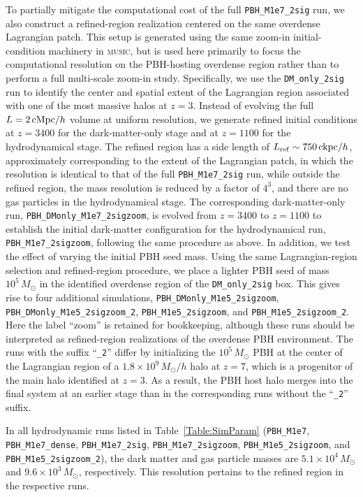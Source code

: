 \documentclass[twocolumn,trackchanges]{aastex701}
\begin{document}
To partially mitigate the computational cost of the full \texttt{PBH\_M1e7\_2sig} run, we also construct a refined-region realization centered on the same overdense Lagrangian patch. This setup is generated using the same zoom-in initial-condition machinery in \textsc{music}, but is used here primarily to focus the computational resolution on the PBH-hosting overdense region rather than to perform a full multi-scale zoom-in study. Specifically, we use the \texttt{DM\_only\_2sig} run to identify the center and spatial extent of the Lagrangian region associated with one of the most massive halos at $z=3$. Instead of evolving the full $L=2\,{\rm cMpc}/h$ volume at uniform resolution, we generate refined initial conditions at $z=3400$ for the dark-matter-only stage and at $z=1100$ for the hydrodynamical stage. The refined region has a side length of $L_{\rm ref}\sim750\,{\rm ckpc}/h$, approximately corresponding to the extent of the Lagrangian patch, in which the resolution is identical to that of the full \texttt{PBH\_M1e7\_2sig} run, while outside the refined region, the mass resolution is reduced by a factor of $4^3$, and there are no gas particles in the hydrodynamical stage. 
The corresponding dark-matter-only run, \texttt{PBH\_DMonly\_M1e7\_2sigzoom}, is evolved from $z=3400$ to $z=1100$ to establish the initial dark-matter configuration for the hydrodynamical run, \texttt{PBH\_M1e7\_2sigzoom}, following the same procedure as above. In addition, we test the effect of varying the initial PBH seed mass. Using the same Lagrangian-region selection and refined-region procedure, we place a lighter PBH seed of mass $10^5\,M_\odot$ in the identified overdense region of the \texttt{DM\_only\_2sig} box. This gives rise to four additional simulations, \texttt{PBH\_DMonly\_M1e5\_2sigzoom}, \texttt{PBH\_DMonly\_M1e5\_2sigzoom\_2}, \texttt{PBH\_M1e5\_2sigzoom}, and \texttt{PBH\_M1e5\_2sigzoom\_2}. Here the label ``zoom'' is retained for bookkeeping, although these runs should be interpreted as refined-region realizations of the overdense PBH environment. The runs with the suffix ``\texttt{\_2}'' differ by initializing the $10^5\,M_\odot$ PBH at the center of the Lagrangian region of a $1.8\times10^9\,M_{\odot}/h$ halo at $z=7$, which is a progenitor of the main halo identified at $z=3$. As a result, the PBH host halo merges into the final system at an earlier stage than in the corresponding runs without the ``\texttt{\_2}'' suffix.

In all hydrodynamic runs listed in Table~\ref{Table:SimParam} (\texttt{PBH\_M1e7}, \texttt{PBH\_M1e7\_dense}, \texttt{PBH\_M1e7\_2sig}, \texttt{PBH\_M1e7\_2sigzoom}, \texttt{PBH\_M1e5\_2sigzoom}, and \texttt{PBH\_M1e5\_2sigzoom\_2}), the dark matter and gas particle masses are $5.1\times10^4\,M_\odot$ and $9.6\times10^3\,M_\odot$, respectively. This resolution pertains to the refined region in the respective runs.
\end{document}
